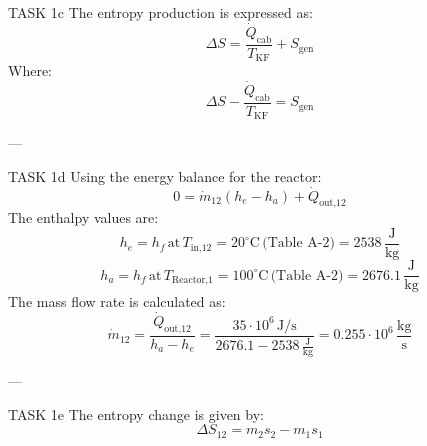 TASK 1c  
The entropy production is expressed as:  
\[
\Delta S = \frac{\dot{Q}_{\text{cab}}}{T_{\text{KF}}} + S_{\text{gen}}
\]  
Where:  
\[
\Delta S - \frac{\dot{Q}_{\text{cab}}}{T_{\text{KF}}} = S_{\text{gen}}
\]  

---

TASK 1d  
Using the energy balance for the reactor:  
\[
0 = \dot{m}_{12} (h_e - h_a) + \dot{Q}_{\text{out,12}}
\]  
The enthalpy values are:  
\[
h_e = h_f \, \text{at} \, T_{\text{in,12}} = 20^\circ\text{C} \, \text{(Table A-2)} = 2538 \, \frac{\text{J}}{\text{kg}}
\]  
\[
h_a = h_f \, \text{at} \, T_{\text{Reactor,1}} = 100^\circ\text{C} \, \text{(Table A-2)} = 2676.1 \, \frac{\text{J}}{\text{kg}}
\]  
The mass flow rate is calculated as:  
\[
\dot{m}_{12} = \frac{\dot{Q}_{\text{out,12}}}{h_a - h_e} = \frac{35 \cdot 10^6 \, \text{J/s}}{2676.1 - 2538 \, \frac{\text{J}}{\text{kg}}} = 0.255 \cdot 10^6 \, \frac{\text{kg}}{\text{s}}
\]  

---

TASK 1e  
The entropy change is given by:  
\[
\Delta S_{12} = m_2 s_2 - m_1 s_1
\]  